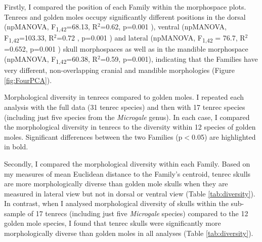 	Firstly, I compared the position of each Family within the morphospace plots. Tenrecs and golden moles occupy significantly different positions in the dorsal (npMANOVA, F\textsubscript{1,42}=68.13, R$^2$=0.62, p=0.001 ), ventral (npMANOVA, F\textsubscript{1,42}=103.33, R$^2$=0.72 , p=0.001 ) and lateral (npMANOVA, F\textsubscript{1,42} = 76.7, R$^2$ =0.652, p=0.001 ) skull morphospaces as well as in the mandible morphospace (npMANOVA, F\textsubscript{1,42}=60.38, R$^2$=0.59, p=0.001),  indicating that the Families have very different, non-overlapping cranial and mandible morphologies (Figure \ref{fig:FourPCA}). 

	
	
	\begin{table}[!htbp]			
		\caption[Comparison of morphological diversity in tenrecs and golden moles.]
		{Morphological diversity in tenrecs compared to golden moles. I repeated each analysis with the full data (31 tenrec species) and then with 17 tenrec species (including just five species from the \textit{Microgale} genus). In each case, I compared the morphological diversity in tenrecs to the diversity within 12 species of golden moles. Significant differences between the two Families (p$<$0.05) are highlighted in bold.}
		 
		\label{tab:diversity}  
	\end{table}


	Secondly, I compared the morphological diversity within each Family. Based on my measures of mean Euclidean distance to the Family's centroid, tenrec skulls are more morphologically diverse than golden mole skulls when they are measured in lateral view but not in dorsal or ventral view (Table \ref{tab:diversity}). In contrast, when I analysed morphological diversity of skulls within the sub-sample of 17 tenrecs (including just five \textit{Microgale} species) compared to the 12 golden mole species, I found that tenrec skulls were significantly more morphologically diverse than golden moles in all analyses (Table \ref{tab:diversity}).
		
